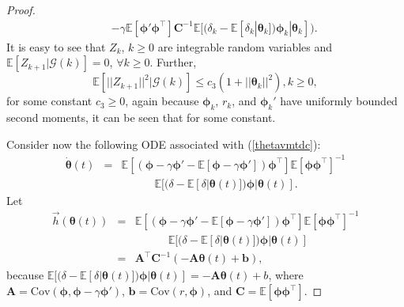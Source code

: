 \begin{proof}
\begin{equation*}
\begin{array}{ccl}
    &&- \gamma\mathbb{E}[{\bm{\phi}}' {\bm{\phi}}^{\top}]\textbf{C}^{-1}\mathbb{E}[(\delta_k -\mathbb{E}[\delta_k|{\bm{\theta}}_k]) {\bm{\phi}}_k|{\bm{\theta}}_k]\big).
        \end{array}
    \end{equation*}
    It is easy to see that $Z_k$, $k\geq 0$ are integrable random variables and $\mathbb{E}[Z_{k+1}|\mathcal{G}(k)]=0$, $\forall k\geq0$. Further,
    \begin{equation*}
    \mathbb{E}[||Z_{k+1}||^2|\mathcal{G}(k)]\leq
    c_3(1+||{\bm{\theta}}_k||^2), k\geq 0,
    \end{equation*}
    for some constant $c_3 \geq 0$, again because ${\bm{\phi}}_k$, $r_k$, and ${\bm{\phi}}_k'$ have
    uniformly bounded second moments, it can be seen that for some constant.
    
    Consider now the following ODE associated with (\ref{thetavmtdc}):
    \begin{equation}
        \label{thetavmtdcSlowerFinal}
        \begin{array}{ccl}
            \dot{{\bm{\theta}}}(t) &=& \mathbb{E}[({\bm{\phi}} - \gamma {\bm{\phi}}' - \mathbb{E}[{\bm{\phi}} - \gamma {\bm{\phi}}']){\bm{\phi}}^\top]\mathbb{E}[{\bm{\phi}} {\bm{\phi}}^{\top}]^{-1}\\
            &&\quad \quad \quad\mathbb{E}[(\delta -\mathbb{E}[\delta|{\bm{\theta}}(t)]) {\bm{\phi}}|{\bm{\theta}}(t)].
         \end{array}
    \end{equation}
    Let 
    \begin{equation*}
    \begin{array}{ccl}
     \vec{h}({\bm{\theta}}(t))&=&\mathbb{E}[({\bm{\phi}} - \gamma {\bm{\phi}}' - \mathbb{E}[{\bm{\phi}} - \gamma {\bm{\phi}}']){\bm{\phi}}^\top]\mathbb{E}[{\bm{\phi}} {\bm{\phi}}^{\top}]^{-1}\\
     &&\quad \quad \quad\mathbb{E}[(\delta -\mathbb{E}[\delta|{\bm{\theta}}(t)]) {\bm{\phi}}|{\bm{\theta}}(t)]\\
        &=& \textbf{A}^{\top}\textbf{C}^{-1}(-\textbf{A}{\bm{\theta}}(t)+{\bm{b}}),
    \end{array}
    \end{equation*}
    because $\mathbb{E}[(\delta -\mathbb{E}[\delta|{\bm{\theta}}(t)]) {\bm{\phi}}|{\bm{\theta}}(t)]=-\textbf{A}{\bm{\theta}}(t)+{b}$, where 
    $\textbf{A} = \mathrm{Cov}({\bm{\phi}},{\bm{\phi}}-\gamma{\bm{\phi}}')$, ${\bm{b}}=\mathrm{Cov}(r,{\bm{\phi}})$, and $\textbf{C}=\mathbb{E}[{\bm{\phi}}{\bm{\phi}}^{\top}]$.
    

\end{proof}
